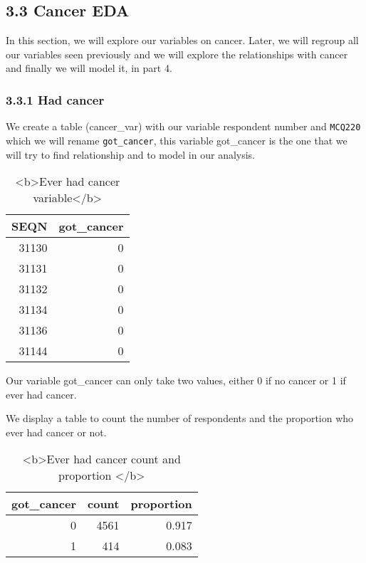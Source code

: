 \documentclass[
]{article}
\begin{document}
\hypertarget{cancer-eda}{%
\subsection{3.3 Cancer EDA}\label{cancer-eda}}

In this section, we will explore our variables on cancer. Later, we will
regroup all our variables seen previously and we will explore the
relationships with cancer and finally we will model it, in part 4.

\hypertarget{had-cancer}{%
\subsubsection{3.3.1 Had cancer}\label{had-cancer}}

We create a table (cancer\_var) with our variable respondent number and
\texttt{MCQ220} which we will rename \texttt{got\_cancer}, this variable
got\_cancer is the one that we will try to find relationship and to
model in our analysis.

\begin{table}

\caption{\label{tab:unnamed-chunk-78}<b>Ever had cancer variable</b>}
\centering
\begin{tabular}[t]{r|r}
\hline
SEQN & got\_cancer\\
\hline
31130 & 0\\
\hline
31131 & 0\\
\hline
31132 & 0\\
\hline
31134 & 0\\
\hline
31136 & 0\\
\hline
31144 & 0\\
\hline
\end{tabular}
\end{table}

Our variable got\_cancer can only take two values, either 0 if no cancer
or 1 if ever had cancer.

We display a table to count the number of respondents and the proportion
who ever had cancer or not.

\begin{table}

\caption{\label{tab:unnamed-chunk-79}<b>Ever had cancer count and proportion </b>}
\centering
\begin{tabular}[t]{r|r|r}
\hline
got\_cancer & count & proportion\\
\hline
0 & 4561 & 0.917\\
\hline
1 & 414 & 0.083\\
\hline
\end{tabular}
\end{table}
\end{document}
